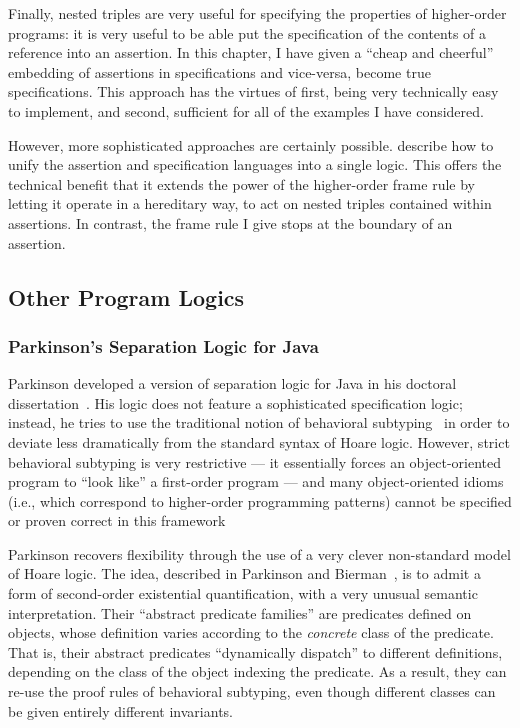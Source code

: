 Finally, nested triples are very useful for specifying the properties
of higher-order programs: it is very useful to be able put the
specification of the contents of a reference into an assertion.  In
this chapter, I have given a ``cheap and cheerful'' embedding of
assertions in specifications and vice-versa, become true
specifications. This approach has the virtues of first, being very
technically easy to implement, and second, sufficient for all of the
examples I have considered.

However, more sophisticated approaches are certainly
possible. \citet{nested-hoare-triples} describe how to unify the
assertion and specification languages into a single logic.  This
offers the technical benefit that it extends the power of the
higher-order frame rule by letting it operate in a hereditary way, to
act on nested triples contained within assertions. In contrast, the
frame rule I give stops at the boundary of an assertion.

\subsection{Other Program Logics}

\subsubsection{Parkinson's Separation Logic for Java}

Parkinson developed a version of separation logic for Java in his
doctoral dissertation~\cite{parkinson-thesis}. His logic does not
feature a sophisticated specification logic; instead, he tries to use
the traditional notion of behavioral
subtyping~\cite{behavioral-subtyping} in order to deviate less
dramatically from the standard syntax of Hoare logic. However, strict
behavioral subtyping is very restrictive --- it essentially forces an
object-oriented program to ``look like'' a first-order program --- and
many object-oriented idioms (i.e., which correspond to higher-order
programming patterns) cannot be specified or proven correct in this 
framework 

Parkinson recovers flexibility through the use of a very clever
non-standard model of Hoare logic. The idea, described in Parkinson
and Bierman~\cite{parkinson-bierman-05}, is to admit a form of
second-order existential quantification, with a very unusual semantic
interpretation. Their ``abstract predicate families'' are predicates
defined on objects, whose definition varies according to the
\emph{concrete} class of the predicate. That is, their abstract
predicates ``dynamically dispatch'' to different definitions,
depending on the class of the object indexing the predicate. As a
result, they can re-use the proof rules of behavioral subtyping, even
though different classes can be given entirely different invariants.

